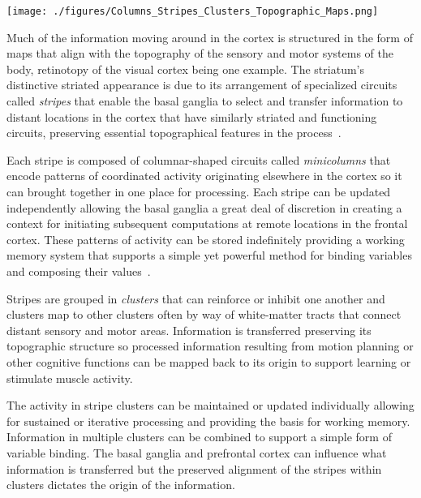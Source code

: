 \begin{center}
  \texttt{[image: ./figures/Columns\_Stripes\_Clusters\_Topographic\_Maps.png]}
\end{center}

Much of the information moving around in the cortex is structured in the form of maps that align with the topography of the sensory and motor systems of the body, retinotopy of the visual cortex being one example. The striatum's distinctive striated appearance is due to its arrangement of specialized circuits called {\it{stripes}} that enable the basal ganglia to select and transfer information to distant locations in the cortex that have similarly striated and functioning circuits, preserving essential topographical features in the process~\cite{BarbasandGarcia-CabezasCOiN-16,LewisetalJNC-02}.

Each stripe is composed of columnar-shaped circuits called {\it{minicolumns}} that encode patterns of coordinated activity originating elsewhere in the cortex so it can brought together in one place for processing. Each stripe can be updated independently allowing the basal ganglia a great deal of discretion in creating a context for initiating subsequent computations at remote locations in the frontal cortex. These patterns of activity can be stored indefinitely providing a working memory system that supports a simple yet powerful method for binding variables and composing their values~\cite{OReillyetalCCN-12}.

Stripes are grouped in {\it{clusters}} that can reinforce or inhibit one another and clusters map to other clusters often by way of white-matter tracts that connect distant sensory and motor areas. Information is transferred preserving its topographic structure so processed information resulting from motion planning or other cognitive functions can be mapped back to its origin to support learning or stimulate muscle activity.

The activity in stripe clusters can be maintained or updated individually allowing for sustained or iterative processing and providing the basis for working memory. Information in multiple clusters can be combined to support a simple form of variable binding. The basal ganglia and prefrontal cortex can influence what information is transferred but the preserved alignment of the stripes within clusters dictates the origin of the information.



